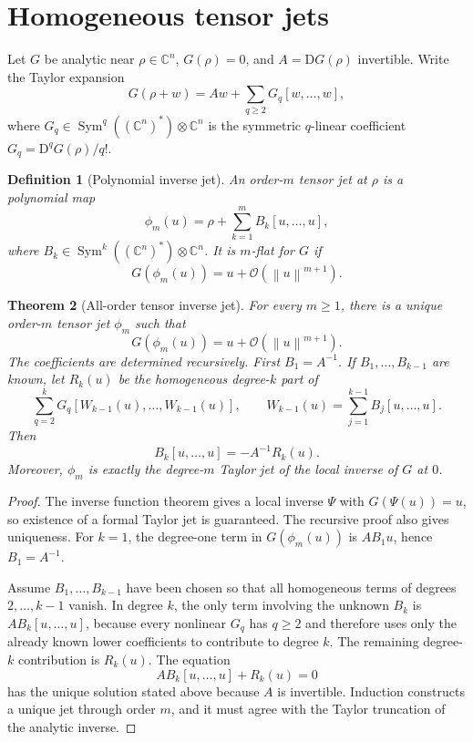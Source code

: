 \documentclass[11pt]{article}
\newtheorem{definition}{Definition}[section]
\newtheorem{theorem}[definition]{Theorem}
\newcommand{\C}{\mathbb C}
\newcommand{\Oterm}{\mathcal O}
\newcommand{\D}{\mathrm D}
\newcommand{\norm}[1]{\left\lVert #1\right\rVert}
\DeclareMathOperator{\Sym}{Sym}
\begin{document}
\section{Homogeneous tensor jets}

Let \(G\) be analytic near \(\rho\in\C^n\), \(G(\rho)=0\), and \(A=\D G(\rho)\) invertible. Write the Taylor expansion
\begin{equation}\label{eq:G-expansion}
        G(\rho+w)
        =
        A w+\sum_{q\ge2} G_q[w,\ldots,w],
\end{equation}
where \(G_q\in \Sym^q((\C^n)^*)\otimes\C^n\) is the symmetric \(q\)-linear coefficient \(G_q=\D^qG(\rho)/q!\).

\begin{definition}[Polynomial inverse jet]
An order-\(m\) tensor jet at \(\rho\) is a polynomial map
\[
        \phi_m(u)=\rho+\sum_{k=1}^m B_k[u,\ldots,u],
\]
where \(B_k\in \Sym^k((\C^n)^*)\otimes\C^n\). It is \(m\)-flat for \(G\) if
\[
        G(\phi_m(u))=u+\Oterm(\norm{u}^{m+1}).
\]
\end{definition}

\begin{theorem}[All-order tensor inverse jet]\label{thm:inverse-jet}
For every \(m\ge1\), there is a unique order-\(m\) tensor jet \(\phi_m\) such that
\[
        G(\phi_m(u))=u+\Oterm(\norm{u}^{m+1}).
\]
The coefficients are determined recursively. First \(B_1=A^{-1}\). If \(B_1,\ldots,B_{k-1}\) are known, let \(R_k(u)\) be the homogeneous degree-\(k\) part of
\[
        \sum_{q=2}^{k}G_q[W_{k-1}(u),\ldots,W_{k-1}(u)],
        \qquad
        W_{k-1}(u)=\sum_{j=1}^{k-1}B_j[u,\ldots,u].
\]
Then
\[
        B_k[u,\ldots,u]=-A^{-1}R_k(u).
\]
Moreover, \(\phi_m\) is exactly the degree-\(m\) Taylor jet of the local inverse of \(G\) at \(0\).
\end{theorem}

\begin{proof}
The inverse function theorem gives a local inverse \(\Psi\) with \(G(\Psi(u))=u\), so existence of a formal Taylor jet is guaranteed. The recursive proof also gives uniqueness. For \(k=1\), the degree-one term in \(G(\phi_m(u))\) is \(AB_1u\), hence \(B_1=A^{-1}\).

Assume \(B_1,\ldots,B_{k-1}\) have been chosen so that all homogeneous terms of degrees \(2,\ldots,k-1\) vanish. In degree \(k\), the only term involving the unknown \(B_k\) is \(AB_k[u,\ldots,u]\), because every nonlinear \(G_q\) has \(q\ge2\) and therefore uses only the already known lower coefficients to contribute to degree \(k\). The remaining degree-\(k\) contribution is \(R_k(u)\). The equation
\[
        AB_k[u,\ldots,u]+R_k(u)=0
\]
has the unique solution stated above because \(A\) is invertible. Induction constructs a unique jet through order \(m\), and it must agree with the Taylor truncation of the analytic inverse.
\end{proof}
\end{document}
